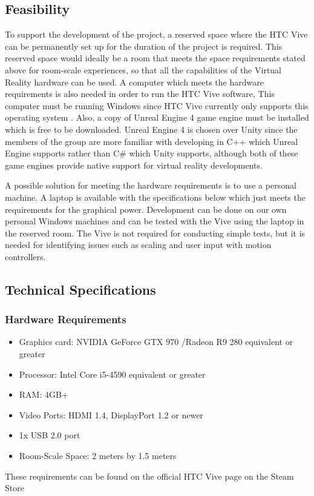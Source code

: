 \subsection{Feasibility}
To support the development of the project, a reserved space where the HTC Vive can be permanently set up for the duration of the project is required. This reserved space would ideally be a room that meets the space requirements stated above for room-scale experiences, so that all the capabilities of the Virtual Reality hardware can be used. A computer which meets the hardware requirements is also needed in order to run the HTC Vive software, This computer must be running Windows since HTC Vive currently only supports this operating system \cite{vivenolinux}. Also, a copy of Unreal Engine 4 game engine must be installed which is free to be downloaded. Unreal Engine 4 is chosen over Unity since the members of the group are more familiar with developing in C++ which Unreal Engine supports rather than C\# which Unity supports, although both of these game engines provide native support for virtual reality developments.
\newline
\par
A possible solution for meeting the hardware requirements is to use a personal machine. A laptop is available with the specifications below which just meets the requirements for the graphical power. Development can be done on our own personal Windows machines and can be tested with the Vive using the laptop in the reserved room. The Vive is not required for conducting simple tests, but it is needed for identifying issues such as scaling and user input with motion controllers.

\subsection{Technical Specifications}

\subsubsection{Hardware Requirements}
\begin{itemize}
	\item Graphics card: NVIDIA GeForce GTX 970 /Radeon R9 280 equivalent or greater
	\item Processor: Intel Core i5-4590 equivalent or greater
	\item RAM: 4GB+
	\item Video Ports: HDMI 1.4, DisplayPort 1.2 or newer 
	\item 1x USB 2.0 port
	\item Room-Scale Space: 2 meters by 1.5 meters
\end{itemize}

These requirements can be found on the official HTC Vive page on the Steam Store \cite{vivehardware}